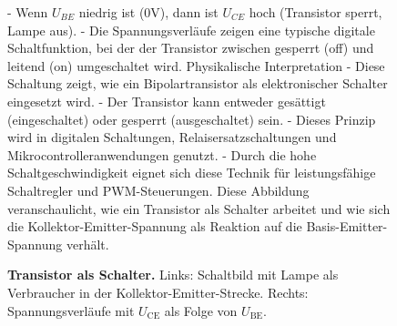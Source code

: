 {\begin{figure}[H]
\begin{minipage}[c]{0.5\textwidth}
{        - Wenn \( U_{BE} \) niedrig ist (0V), dann ist \( U_{CE} \) hoch (Transistor sperrt, Lampe aus).  
        - Die Spannungsverläufe zeigen eine typische digitale Schaltfunktion, bei der der Transistor zwischen gesperrt (off) und leitend (on) umgeschaltet wird.  
        Physikalische Interpretation
        - Diese Schaltung zeigt, wie ein Bipolartransistor als elektronischer Schalter eingesetzt wird.  
        - Der Transistor kann entweder gesättigt (eingeschaltet) oder gesperrt (ausgeschaltet) sein.  
        - Dieses Prinzip wird in digitalen Schaltungen, Relaisersatzschaltungen und Mikrocontrolleranwendungen genutzt.  
        - Durch die hohe Schaltgeschwindigkeit eignet sich diese Technik für leistungsfähige Schaltregler und PWM-Steuerungen.  
        Diese Abbildung veranschaulicht, wie ein Transistor als Schalter arbeitet und wie sich die Kollektor-Emitter-Spannung als Reaktion auf die Basis-Emitter-Spannung verhält.}
    \end{minipage}
    \label{fig:TransistorAlsSchalter}
    \caption{\textbf{Transistor als Schalter.} Links: Schaltbild mit Lampe als Verbraucher in der Kollektor-Emitter-Strecke. Rechts:
        Spannungsverläufe mit $U_\mathrm{CE}$ als Folge von $U_\mathrm{BE}$.}
\end{figure}
}



   
